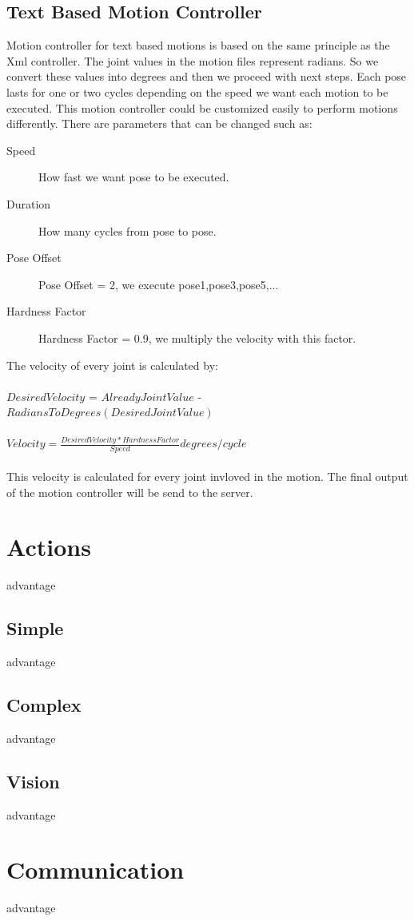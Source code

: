 \subsection{Text Based Motion Controller}
Motion controller for text based motions is based on the same principle as the Xml controller. The joint values in the motion files represent
radians. So we convert these values into degrees and then we proceed with next steps. Each pose lasts for one or two cycles depending on the speed we want each motion to be executed. This motion controller could be customized easily to perform motions differently. There are parameters that can be changed such as:
\begin{description}
	\item[Speed] How fast we want pose to be executed.
	\item[Duration]	How many cycles from pose to pose.
	\item[Pose Offset] Pose Offset = 2, we execute pose1,pose3,pose5,...
	\item[Hardness Factor]	Hardness Factor = 0.9, we multiply the velocity with this factor.
\end{description}
The velocity of every joint is calculated by:\\
\\
$Desired Velocity$ = $Already Joint Value$ - $RadiansToDegrees(Desired Joint Value)$
\\
\\
$Velocity = \frac {Desired Velocity \ast Hardness Factor} {Speed} degrees/cycle$\\
\\
This velocity is calculated for every joint invloved in the motion. The final output of the motion controller will be send to the server.





\section{Actions}
advantage





\subsection{Simple}
advantage





\subsection{Complex}
advantage





\subsection{Vision}
advantage





\section{Communication}
advantage
